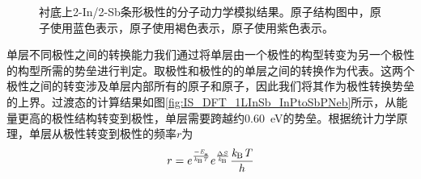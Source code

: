 \begin{figure}[!htb]
    \caption{衬底上2-In/2-Sb条形极性的分子动力学模拟结果。原子结构图中，原子使用蓝色表示，原子使用褐色表示，原子使用紫色表示。}
    \label{fig:IS_structure_1Linsb_md}
\end{figure}

单层不同极性之间的转换能力我们通过将单层由一个极性的构型转变为另一个极性的构型所需的势垒进行判定。取极性和极性的的单层之间的转换作为代表。这两个极性之间的转变涉及单层内部所有的原子和原子，因此我们将其作为极性转换势垒的上界。过渡态的计算结果如图\ref{fig:IS_DFT_1LInSb_InPtoSbPNeb}所示，从能量更高的极性结构转变到极性，单层需要跨越约\SI{0.60}{\electronvolt}的势垒。根据统计力学原理，单层从极性转变到极性的频率$r$为\chinesecolon
\[
    r=e^{\frac{-\it E_{\rm a}^{\rm } \it}{\it k_{\rm B} \it T}}e^{\frac{\Delta S}{\it k_{\rm B} \it}} \frac{\it k_{\rm B} \it T}{h}
\]

